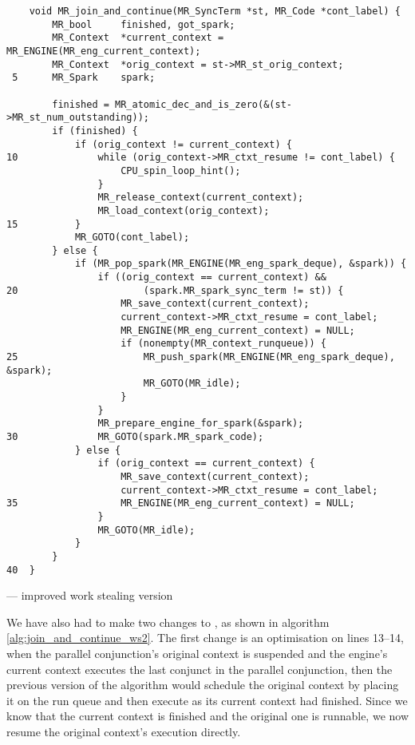 \begin{algorithm}[tbp]
\begin{verbatim}
    void MR_join_and_continue(MR_SyncTerm *st, MR_Code *cont_label) {
        MR_bool     finished, got_spark;
        MR_Context  *current_context = MR_ENGINE(MR_eng_current_context); 
        MR_Context  *orig_context = st->MR_st_orig_context;
 5      MR_Spark    spark;

        finished = MR_atomic_dec_and_is_zero(&(st->MR_st_num_outstanding));
        if (finished) {
            if (orig_context != current_context) {
10              while (orig_context->MR_ctxt_resume != cont_label) {
                    CPU_spin_loop_hint();
                }
                MR_release_context(current_context);
                MR_load_context(orig_context);
15          }
            MR_GOTO(cont_label);
        } else {
            if (MR_pop_spark(MR_ENGINE(MR_eng_spark_deque), &spark)) {
                if ((orig_context == current_context) &&
20                      (spark.MR_spark_sync_term != st)) {
                    MR_save_context(current_context);
                    current_context->MR_ctxt_resume = cont_label;
                    MR_ENGINE(MR_eng_current_context) = NULL;
                    if (nonempty(MR_context_runqueue)) {
25                      MR_push_spark(MR_ENGINE(MR_eng_spark_deque), &spark);
                        MR_GOTO(MR_idle);
                    }
                }
                MR_prepare_engine_for_spark(&spark);
30              MR_GOTO(spark.MR_spark_code);
            } else {
                if (orig_context == current_context) {
                    MR_save_context(current_context);
                    current_context->MR_ctxt_resume = cont_label;
35                  MR_ENGINE(MR_eng_current_context) = NULL;
                }
                MR_GOTO(MR_idle);
            }
        }
40  }
\end{verbatim}
\caption{\joinandcontinue --- improved work stealing version}
\label{alg:join_and_continue_ws2}
\end{algorithm}

We have also had to make two changes to \joinandcontinue,
as shown in algorithm \ref{alg:join_and_continue_ws2}.
The first change is an optimisation on lines 13--14,
when the parallel conjunction's original context is suspended
and the engine's current context executes the last conjunct in the parallel
conjunction,
then the previous version of the algorithm would schedule the original
context by placing it on the run queue and then execute \idle as its current
context had finished.
Since we know that the current context is finished and the original one is
runnable,
we now resume the original context's execution directly.

